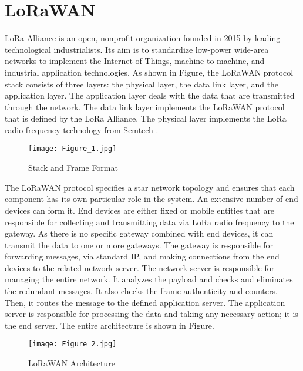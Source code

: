 \documentclass[manuscript,screen,review=false]{acmart}
\begin{document}
\section{LoRaWAN}
LoRa Alliance is an open, nonprofit organization founded in 2015 by leading technological industrialists. Its aim is to standardize low-power wide-area networks to implement the Internet of Things, machine to machine, and industrial application technologies. As shown in Figure, the LoRaWAN protocol stack consists of three layers: the physical layer, the data link layer, and the application layer. The application layer deals with the data that are transmitted through the network. The data link layer implements the LoRaWAN protocol that is defined by the LoRa Alliance. The physical layer implements the LoRa radio frequency technology from Semtech \cite{lorawan1.1}. 

\begin{figure}[h]
  \centering
  \texttt{[image: Figure\_1.jpg]}
  \caption{Stack and Frame Format}
\end{figure}


The LoRaWAN protocol specifies a star network topology and ensures that each component has its own particular role in the system. An extensive number of end devices can form it. End devices are either fixed or mobile entities that are responsible for collecting and transmitting data via LoRa radio frequency to the gateway. As there is no specific gateway combined with end devices, it can transmit the data to one or more gateways. The gateway is responsible for forwarding messages, via standard IP, and making connections from the end devices to the related network server. The network server is responsible for managing the entire network. It analyzes the payload and checks and eliminates the redundant messages. It also checks the frame authenticity and counters. Then, it routes the message to the defined application server. The application server is responsible for processing the data and taking any necessary action; it is the end server. The entire architecture is shown in Figure.

\begin{figure}[h]
  \centering
  \texttt{[image: Figure\_2.jpg]}
  \caption{LoRaWAN Architecture}
\end{figure}
\end{document}
